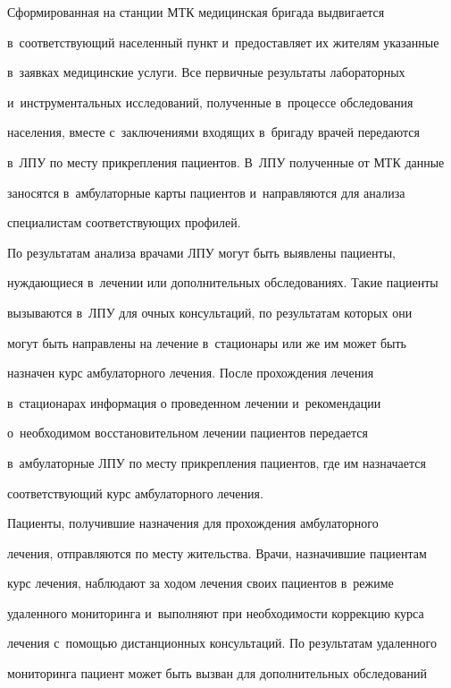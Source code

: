   Сформированная на станции МТК медицинская бригада выдвигается 


в~соответствующий населенный пункт и~предоставляет их жителям указанные 


в~заявках медицинские услуги. Все первичные результаты лабораторных 


и~инструментальных исследований, полученные в~процессе обследования 


населения, вместе с~заключениями входящих в~бригаду врачей передаются 


в~ЛПУ по месту прикрепления пациентов. В~ЛПУ полученные от МТК данные 


заносятся в~амбулаторные карты пациентов и~направляются для анализа 


специалистам соответствующих профилей.


  


  По результатам анализа врачами ЛПУ могут быть выявлены пациенты, 


нуж\-да\-ющи\-еся в~лечении или дополнительных обследованиях. Такие пациенты 


вызываются в~ЛПУ для очных консультаций, по результатам которых они 


могут быть направлены на лечение в~стационары или же им может быть 


назначен курс амбулаторного лечения. После прохождения лечения 


в~стационарах информация о проведенном лечении и~рекомендации 


о~необходимом восстановительном лечении пациентов передается 


в~амбулаторные ЛПУ по месту прикрепления пациентов, где им назначается 


соответствующий курс амбулаторного лечения.


  


  Пациенты, получившие назначения для прохождения амбулаторного 


лечения, отправляются по месту жительства. Врачи, назначившие пациентам 


курс лечения, наблюдают за ходом лечения своих пациентов в~режиме 


удаленного мониторинга и~выполняют при необходимости коррекцию курса 


лечения с~помощью дистанционных консультаций. По результатам удаленного 


мониторинга пациент может быть вызван для дополнительных обследований 


